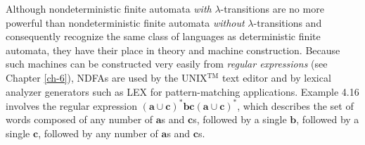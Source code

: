 
Although nondeterministic finite automata \emph{with} $\lambda$-transitions are
no more powerful than nondeterministic finite automata \emph{without}
$\lambda$-transitions and consequently recognize the same class of languages as
deterministic finite automata, they have their place in theory and machine
construction. Because such machines can be constructed very easily from
\emph{regular expressions} (see Chapter \ref{ch-6}), NDFAs are used by the
UNIX$^{\text{TM}}$ text editor and by lexical analyzer generators such as LEX for
pattern-matching applications. Example 4.16 involves the regular expression
$(\pmb{a}\cup\pmb{c})^*\pmb{bc}(\pmb{a}\cup\pmb{c})^*$, which describes the set
of words composed of any number of $\pmb{a}$s and $\pmb{c}$s, followed by a single
$\pmb{b}$, followed by a single $\pmb{c}$, followed by any number of $\pmb{a}$s and
$\pmb{c}$s.

